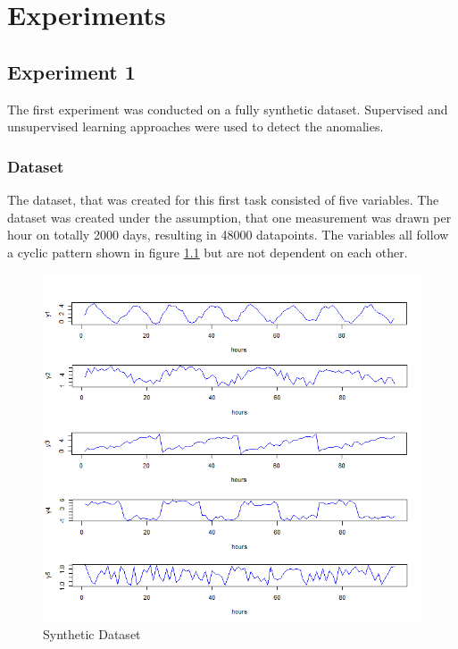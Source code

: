 \chapter{Experiments}
 
\section{Experiment 1}
The first experiment was conducted on a fully synthetic dataset. Supervised and unsupervised learning approaches were used to detect the anomalies. 

\subsection{Dataset} \label{dataset1}
The dataset, that was created for this first task consisted of five variables. The dataset was created under the assumption, that one measurement was drawn per hour on totally 2000 days, resulting in 48000 datapoints. The variables all follow a cyclic pattern shown in figure \ref{fig:synthetic data} but are not dependent on each other. 

\begin{figure}[h]
	\centering
	\includegraphics[scale=0.7]{Figures/synthetic data}
	\decoRule
	\caption[Synthetic Dataset]{Synthetic Dataset \parencite{own}}
	\label{fig:synthetic data}
\end{figure}


